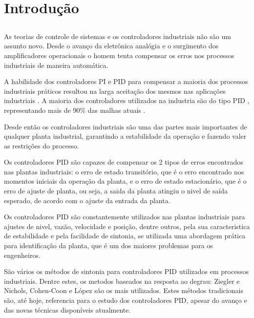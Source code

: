 \chapter{Introdução\label{cap:introducao}}

\section*{}

    As teorias de controle de sistemas e os controladores industriais não são um assunto
    novo. Desde o avanço da eletrônica analógia e o surgimento dos amplificadores
    operacionais o homem tenta compensar os erros nos processos industriais de maneira
    automática.

    A habilidade dos controladores \ac{PI} e \ac{PID} para compensar a maioria dos processos
    industriais práticos resultou na larga aceitação dos mesmos nas aplicações industriais
    \cite{Dwyer}. A maioria dos controladores utilizados na industria são do tipo
    \acs{PID} \cite{astrom1984645}, representando mais de 90\% das malhas atuais \cite{astrom20011163}. 

    Desde então os controladores industriais são uma das partes mais importantes de qualquer
    planta industrial, garantindo a estabilidade da operação e fazendo valer as restrições
    do processo.

    Os controladores \acs{PID} são capazes de compensar os 2 tipos de erros encontrados
    nas plantas industriais: o erro de estado transitório, que é o erro encontrado nos momentos
    iniciais da operação da planta, e o erro de estado estacionário, que é o erro de
    ajuste de planta, ou seja, a saida da planta atingiu o nivel de saída esperado, de
    acordo com o ajuste da entrada da planta.

    Os controladores \acs{PID} são constantemente utilizados nas plantas industriais para
    ajustes de nivel, vazão, velocidade e posição, dentre outros, pela sua caracteristica
    de estabilidade e pela facilidade de sintonia, se utilizada uma abordagem prática
    para identificação da planta, que é um dos maiores problemas para os engenheiros.

    São vários os métodos de sintonia para controladores \acs{PID} utilizados em processos
    industriais. Dentre estes, os metodos baseados na resposta ao degrau: Ziegler e Nichols,
    Cohen-Coon e López são os mais utilizados. Estes métodos tradicionais são, até hoje,
    referencia para o estudo dos controladores \ac{PID}, apesar do avanço e das novas
    técnicas disponíveis atualmente.

